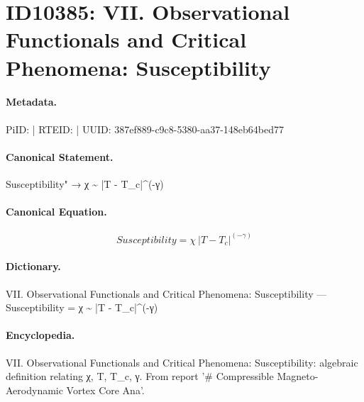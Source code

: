 \section*{ID10385: VII. Observational Functionals and Critical Phenomena: Susceptibility}
\paragraph{Metadata.}
PiID:  | RTEID:  | UUID: 387ef889-c9c8-5380-aa37-148eb64bed77

\paragraph{Canonical Statement.}
Susceptibility" → χ \textasciitilde{} |T - T\_c|\textasciicircum{}(-γ)

\paragraph{Canonical Equation.}
\[
Susceptibility = χ ~ |T - T_c|^(-γ)
\]

\paragraph{Dictionary.}
VII. Observational Functionals and Critical Phenomena: Susceptibility — Susceptibility = χ \textasciitilde{} |T - T\_c|\textasciicircum{}(-γ)

\paragraph{Encyclopedia.}
VII. Observational Functionals and Critical Phenomena: Susceptibility: algebraic definition relating χ, T, T\_c, γ. From report '\# Compressible Magneto-Aerodynamic Vortex Core Ana'.
